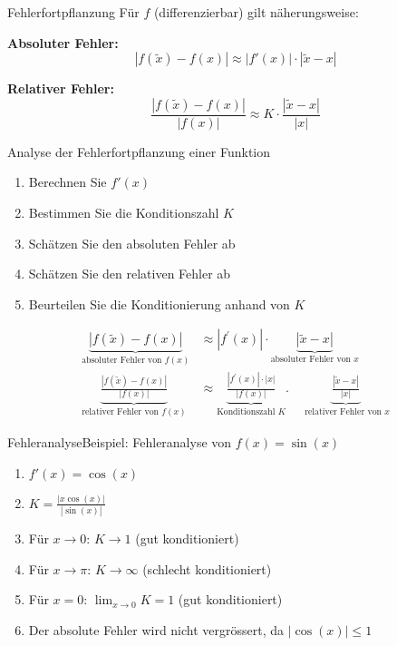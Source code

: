 \begin{theorem}{Fehlerfortpflanzung}
Für $f$ (differenzierbar) gilt näherungsweise:
\vspace{1mm}\\
\begin{minipage}[t]{0.47\textwidth}
    \textbf{Absoluter Fehler:}  
    \vspace{-2mm}\\
    $$|f(\tilde{x})-f(x)| \approx |f'(x)| \cdot |\tilde{x}-x|$$
\end{minipage}
\hspace{3mm}
\begin{minipage}[t]{0.43\textwidth}
    \textbf{Relativer Fehler:}  
    \vspace{-2mm}\\
    $$\frac{|f(\tilde{x})-f(x)|}{|f(x)|} \approx K \cdot \frac{|\tilde{x}-x|}{|x|}$$
\end{minipage}
\end{theorem}

\begin{KR}{Analyse der Fehlerfortpflanzung einer Funktion}
\begin{enumerate}
    \item Berechnen Sie $f'(x)$
    \item Bestimmen Sie die Konditionszahl $K$
    \item Schätzen Sie den absoluten Fehler ab
    \item Schätzen Sie den relativen Fehler ab
    \item Beurteilen Sie die Konditionierung anhand von $K$
\end{enumerate}
\vspace{1mm}
$$
\begin{aligned}
\underbrace{|f(\tilde{x})-f(x)|}_{\text {absoluter Fehler von } f(x)} & \approx\left|f^{\prime}(x)\right| \cdot \underbrace{|\tilde{x}-x|}_{\text {absoluter Fehler von } x} \\
\underbrace{\frac{|f(\tilde{x})-f(x)|}{|f(x)|}}_{\text {relativer Fehler von } f(x)} & \approx \underbrace{\frac{\left|f^{\prime}(x)\right| \cdot|x|}{|f(x)|}}_{\text {Konditionszahl } K} . \quad \underbrace{\frac{|\tilde{x}-x|}{|x|}}_{\text { relativer Fehler von } x }
\end{aligned}
$$
\end{KR}

\raggedcolumns

\begin{example2}{Fehleranalyse}Beispiel: Fehleranalyse von $f(x)=\sin(x)$
\begin{enumerate}
    \item $f'(x) = \cos(x)$
    \item $K = \frac{|x\cos(x)|}{|\sin(x)|}$
    \item Für $x \to 0$: $K \to 1$ (gut konditioniert)
    \item Für $x \to \pi$: $K \to \infty$ (schlecht konditioniert)
    \item Für $x = 0$: $\lim_{x \to 0} K = 1$ (gut konditioniert)
    \item Der absolute Fehler wird nicht vergrössert, da $|\cos(x)| \leq 1$
\end{enumerate}
\end{example2}

